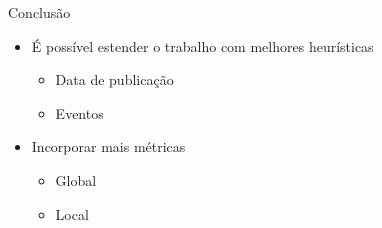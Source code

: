 \documentclass{beamer}
\begin{document}
\begin{frame}{Conclusão}{}
  \begin{itemize}
    \item É possível estender o trabalho com melhores heurísticas
    \begin{itemize}
      \item Data de publicação
      \item Eventos
    \end{itemize}
    \item Incorporar mais métricas  
    \begin{itemize}
      \item Global
      \item Local
    \end{itemize}
  \end{itemize}
\end{frame}

\section{}

\begin{frame}
  \titlepage
\end{frame}
\end{document}
